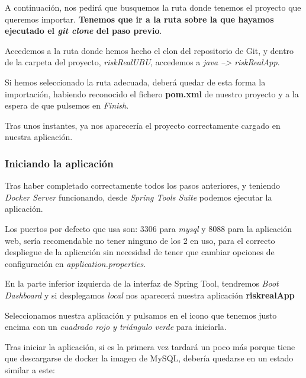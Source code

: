 
A continuación, nos pedirá que busquemos la ruta donde tenemos el proyecto que queremos importar. \textbf{Tenemos que ir a la ruta sobre la que hayamos ejecutado el \textit{git clone} del paso previo}.

Accedemos a la ruta donde hemos hecho el clon del repositorio de Git, y dentro de la carpeta del proyecto, \textit{riskRealUBU}, accedemos a \textit{java --> riskRealApp}.

Si hemos seleccionado la ruta adecuada, deberá quedar de esta forma la importación, habiendo reconocido el fichero \textbf{pom.xml} de nuestro proyecto y a la espera de que pulsemos en \textit{Finish}.


Tras unos instantes, ya nos aparecería el proyecto correctamente cargado en nuestra aplicación.


\subsubsection{Iniciando la aplicación}

Tras haber completado correctamente todos los pasos anteriores, y teniendo \textit{Docker Server} funcionando, desde \textit{Spring Tools Suite} podemos ejecutar la aplicación.

Los puertos por defecto que usa son: 3306 para \textit{mysql} y 8088 para la aplicación web, sería recomendable no tener ninguno de los 2 en uso, para el correcto despliegue de la aplicación sin necesidad de tener que cambiar opciones de configuración en \textit{application.properties}.

En la parte inferior izquierda de la interfaz de Spring Tool, tendremos \textit{Boot Dashboard} y si desplegamos \textit{local} nos aparecerá nuestra aplicación \textbf{riskrealApp}

Seleccionamos nuestra aplicación y pulsamos en el icono que tenemos justo encima con un \textit{cuadrado rojo y triángulo verde} para iniciarla.


Tras iniciar la aplicación, si es la primera vez tardará un poco más porque tiene que descargarse de docker la imagen de MySQL, debería quedarse en un estado similar a este:

